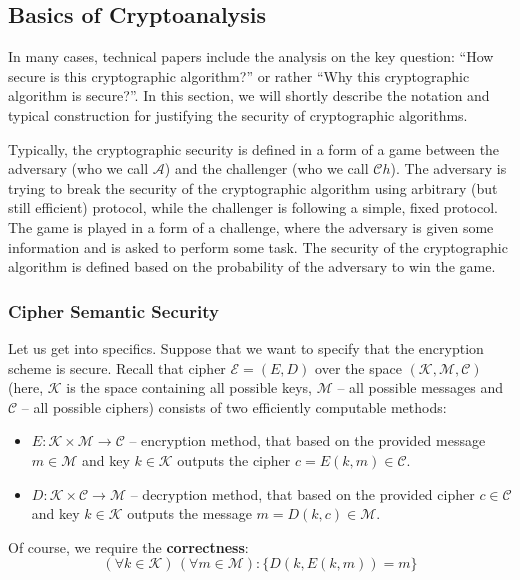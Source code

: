 \documentclass[../lecture-notes.tex]{subfiles}
\begin{document}
\subsection{Basics of Cryptoanalysis}

In many cases, technical papers include the analysis on the key question: ``How secure is this cryptographic algorithm?'' or rather ``Why this cryptographic algorithm is secure?''. In this section, we will shortly describe the notation and typical construction for justifying the security of cryptographic algorithms.

Typically, the cryptographic security is defined in a form of a game between the adversary (who we call $\mathcal{A}$) and the challenger (who we call $\mathcal{C}h$). The adversary is trying to break the security of the cryptographic algorithm using arbitrary (but still efficient) protocol, while the challenger is following a simple, fixed protocol. The game is played in a form of a challenge, where the adversary is given some information and is asked to perform some task. The security of the cryptographic algorithm is defined based on the probability of the adversary to win the game.

\subsubsection{Cipher Semantic Security}
Let us get into specifics. Suppose that we want to specify that the encryption scheme is secure. Recall that cipher $\mathcal{E} = (E,D)$ over the space $(\mathcal{K}, \mathcal{M}, \mathcal{C})$ (here, $\mathcal{K}$ is the space containing all possible keys, $\mathcal{M}$ -- all possible messages and $\mathcal{C}$ -- all possible ciphers) consists of two efficiently computable methods:
\begin{itemize}
    \item $E: \mathcal{K} \times \mathcal{M} \to \mathcal{C}$ -- encryption method, that based on the provided message $m \in \mathcal{M}$ and key $k \in \mathcal{K}$ outputs the cipher $c = E(k,m) \in \mathcal{C}$.
    \item $D: \mathcal{K} \times \mathcal{C} \to \mathcal{M}$ -- decryption method, that based on the provided cipher $c \in \mathcal{C}$ and key $k \in \mathcal{K}$ outputs the message $m = D(k,c) \in \mathcal{M}$.
\end{itemize}

Of course, we require the \textbf{correctness}:
\begin{equation}
    (\forall k \in \mathcal{K}) \, (\forall m \in \mathcal{M}): \{D(k,E(k,m)) = m\}
\end{equation}
\end{document}
